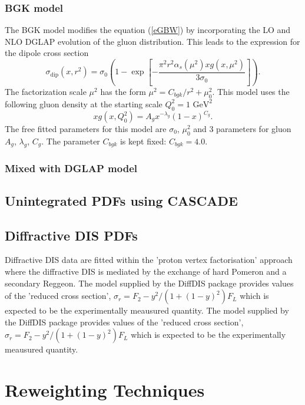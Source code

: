 \documentclass[11pt,a4paper]{article}
\begin{document}
\subsubsection{BGK model}
The BGK model modifies the equation (\ref{eGBW}) by incorporating the LO and NLO DGLAP evolution
of the gluon distribution. This leads to the expression for the dipole cross section
\begin{equation*}
\label{eBGK}
   \sigma_{\text{dip}}(x,r^{2}) = \sigma_{0} \left(1 - \exp \left[-\frac{\pi^{2} r^{2} \alpha_{s}(\mu^{2}) xg(x,\mu^{2})}{3 \sigma_{0}} \right]\right).
\end{equation*}
The factorization scale $\mu^{2}$ has the form $\mu^{2} = C_{bgk}/r^{2}+\mu^{2}_{0}$.
This model uses the following gluon density at the starting scale $Q_{0}^{2}=1\mbox{ GeV}^{2}$
\begin{equation*}
\label{eqTH730}
   xg(x,Q^{2}_{0}) = A_{g} x^{-\lambda_{g}}(1-x)^{C_{g}}.
\end{equation*}
The free fitted parameters for this model are $\sigma_{0}$, $\mu^{2}_{0}$ and 3 parameters for gluon $A_{g}$, $\lambda_{g}$, $C_{g}$. The parameter $C_{bgk}$ is kept fixed: $C_{bgk} = 4.0$. 
\subsubsection{Mixed with DGLAP model}
\subsection{Unintegrated PDFs using CASCADE}
\subsection{Diffractive DIS PDFs}
Diffractive DIS data are fitted within the 'proton vertex factorisation' approach where 
the diffractive DIS is mediated by the exchange of hard Pomeron and a secondary Reggeon.
The model supplied by the DiffDIS package provides values of the 'reduced cross section',
$\sigma_r = F_2 - y^2/(1+(1-y)^2) F_L$
which is expected to be the experimentally meausured quantity.
The model supplied by the DiffDIS package provides values of the 'reduced cross section',
$\sigma_r = F_2 - y^2/(1+(1-y)^2) F_L$
which is expected to be the experimentally meausured quantity.

\section{Reweighting Techniques}
\end{document}

